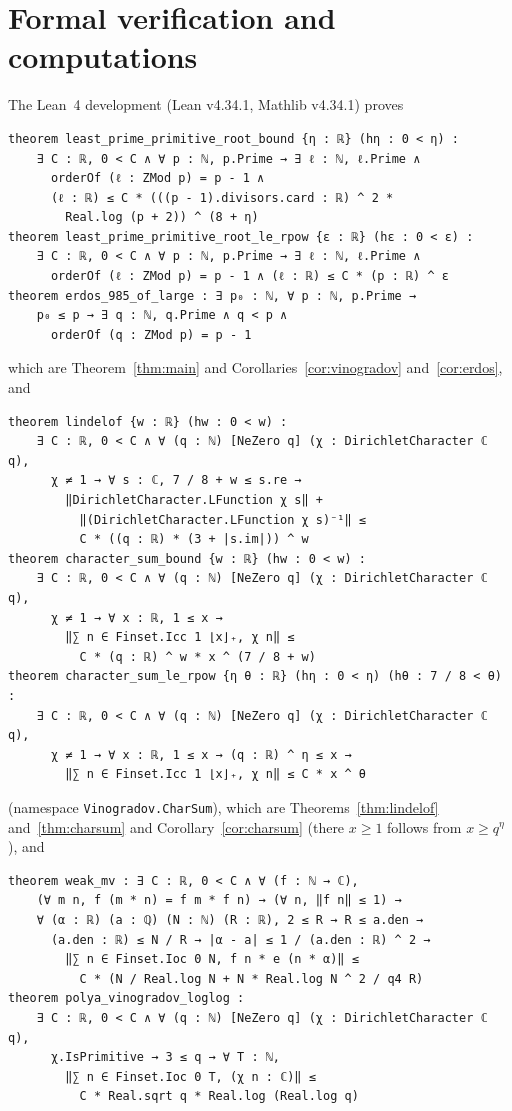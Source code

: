 \documentclass[12pt]{amsart}
\theoremstyle{remark}
\begin{document}
\section{Formal verification and computations}\label{sec:lean}

The Lean~4 development (Lean v4.34.1, Mathlib v4.34.1) proves
{\footnotesize
\begin{verbatim}
theorem least_prime_primitive_root_bound {η : ℝ} (hη : 0 < η) :
    ∃ C : ℝ, 0 < C ∧ ∀ p : ℕ, p.Prime → ∃ ℓ : ℕ, ℓ.Prime ∧
      orderOf (ℓ : ZMod p) = p - 1 ∧
      (ℓ : ℝ) ≤ C * (((p - 1).divisors.card : ℝ) ^ 2 *
        Real.log (p + 2)) ^ (8 + η)
theorem least_prime_primitive_root_le_rpow {ε : ℝ} (hε : 0 < ε) :
    ∃ C : ℝ, 0 < C ∧ ∀ p : ℕ, p.Prime → ∃ ℓ : ℕ, ℓ.Prime ∧
      orderOf (ℓ : ZMod p) = p - 1 ∧ (ℓ : ℝ) ≤ C * (p : ℝ) ^ ε
theorem erdos_985_of_large : ∃ p₀ : ℕ, ∀ p : ℕ, p.Prime →
    p₀ ≤ p → ∃ q : ℕ, q.Prime ∧ q < p ∧
      orderOf (q : ZMod p) = p - 1
\end{verbatim}}
which are Theorem~\ref{thm:main} and Corollaries~\ref{cor:vinogradov} and~\ref{cor:erdos}, and
{\footnotesize
\begin{verbatim}
theorem lindelof {w : ℝ} (hw : 0 < w) :
    ∃ C : ℝ, 0 < C ∧ ∀ (q : ℕ) [NeZero q] (χ : DirichletCharacter ℂ q),
      χ ≠ 1 → ∀ s : ℂ, 7 / 8 + w ≤ s.re →
        ‖DirichletCharacter.LFunction χ s‖ +
          ‖(DirichletCharacter.LFunction χ s)⁻¹‖ ≤
          C * ((q : ℝ) * (3 + |s.im|)) ^ w
theorem character_sum_bound {w : ℝ} (hw : 0 < w) :
    ∃ C : ℝ, 0 < C ∧ ∀ (q : ℕ) [NeZero q] (χ : DirichletCharacter ℂ q),
      χ ≠ 1 → ∀ x : ℝ, 1 ≤ x →
        ‖∑ n ∈ Finset.Icc 1 ⌊x⌋₊, χ n‖ ≤
          C * (q : ℝ) ^ w * x ^ (7 / 8 + w)
theorem character_sum_le_rpow {η θ : ℝ} (hη : 0 < η) (hθ : 7 / 8 < θ) :
    ∃ C : ℝ, 0 < C ∧ ∀ (q : ℕ) [NeZero q] (χ : DirichletCharacter ℂ q),
      χ ≠ 1 → ∀ x : ℝ, 1 ≤ x → (q : ℝ) ^ η ≤ x →
        ‖∑ n ∈ Finset.Icc 1 ⌊x⌋₊, χ n‖ ≤ C * x ^ θ
\end{verbatim}}
\noindent(namespace \texttt{Vinogradov.CharSum}), which are Theorems~\ref{thm:lindelof}
and~\ref{thm:charsum} and Corollary~\ref{cor:charsum} (there $x\ge1$ follows from $x\ge q^\eta$),
and
{\footnotesize
\begin{verbatim}
theorem weak_mv : ∃ C : ℝ, 0 < C ∧ ∀ (f : ℕ → ℂ),
    (∀ m n, f (m * n) = f m * f n) → (∀ n, ‖f n‖ ≤ 1) →
    ∀ (α : ℝ) (a : ℚ) (N : ℕ) (R : ℝ), 2 ≤ R → R ≤ a.den →
      (a.den : ℝ) ≤ N / R → |α - a| ≤ 1 / (a.den : ℝ) ^ 2 →
        ‖∑ n ∈ Finset.Ioc 0 N, f n * e (n * α)‖ ≤
          C * (N / Real.log N + N * Real.log N ^ 2 / q4 R)
theorem polya_vinogradov_loglog :
    ∃ C : ℝ, 0 < C ∧ ∀ (q : ℕ) [NeZero q] (χ : DirichletCharacter ℂ q),
      χ.IsPrimitive → 3 ≤ q → ∀ T : ℕ,
        ‖∑ n ∈ Finset.Ioc 0 T, (χ n : ℂ)‖ ≤
          C * Real.sqrt q * Real.log (Real.log q)
\end{verbatim}}
\end{document}
